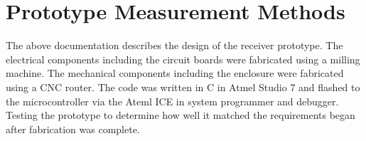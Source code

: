 \documentclass{article}
\begin{document}


% 
% 


\section{Prototype Measurement Methods}
	The above documentation describes the design of the receiver prototype.  The electrical components including the circuit boards were fabricated using a milling machine.  The mechanical components including the enclosure were fabricated using a CNC router.  The code was written in C in Atmel Studio 7 and flashed to the microcontroller via the Ateml ICE in system programmer and debugger.  Testing the prototype to determine how well it matched the requirements began after fabrication was complete.
\end{document}
